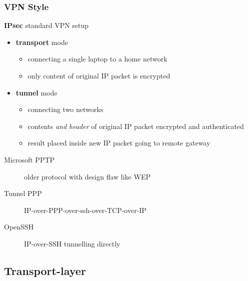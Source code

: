 \documentclass[]{article}
\theoremstyle{definition}
\begin{document}
	\subsubsection{VPN Style}
	\textbf{IPsec} standard VPN setup
	\begin{itemize}
		\item \textbf{transport} mode
			\begin{itemize}
				\item connecting a single laptop to a home network
				\item only content of original IP packet is encrypted
			\end{itemize}
		\item \textbf{tunnel} mode
			\begin{itemize}
				\item connecting two networks
				\item contents \textit{and header} of original IP packet encrypted and authenticated
				\item result placed inside new IP packet going to remote gateway
			\end{itemize}
	\end{itemize}
	\begin{description}
		\item[Microsoft PPTP] older protocol with design flaw like WEP
		\item[Tunnel PPP] IP-over-PPP-over-ssh-over-TCP-over-IP
		\item[OpenSSH] IP-over-SSH tunnelling directly
	\end{description}

	\subsection{Transport-layer}
\end{document}
